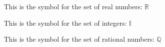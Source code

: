 \documentclass{article}
\begin{document}
This is the symbol for the set of real numbers: $\mathbb{R}$

This is the symbol for the set of integers: $\mathbb{I}$

This is the symbol for the set of rational numbers: $\mathbb{Q}$
\end{document}
